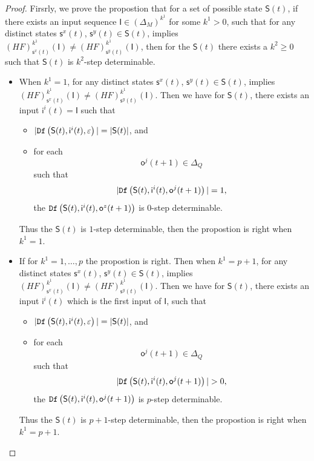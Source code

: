 \begin{proof}
Firsrly, we prove the propostion that for a set of possible state $\mathsf{S}(t)$, if there exists an input sequence $\mathsf{I}\in(\Delta_M)^{k^1}$ for some $k^1 >0$, such that for any distinct states $\mathsf{s}^{x}(t)$, $\mathsf{s}^{y}(t) \in \mathsf{S}(t)$, implies $(HF)^{k^1}_{\mathsf{s}^{x}(t)}(\mathsf{I})\neq (HF)^{k^1}_{\mathsf{s}^{y}(t)}(\mathsf{I})$, then for the $\mathsf{S}(t)$ there exists a $k^{2}\ge 0$ such that $\mathsf{S}(t)$ is $k^{2}$-step determinable.


\begin{itemize}
\item When $k^1=1$, for any distinct states $\mathsf{s}^{x}(t)$, $\mathsf{s}^{y}(t) \in \mathsf{S}(t)$, implies $(HF)^{k^1}_{\mathsf{s}^{x}(t)}(\mathsf{I})\neq (HF)^{k^1}_{\mathsf{s}^{y}(t)}(\mathsf{I})$. Then we have for $\mathsf{S}(t)$,
 there exists an input $\mathsf{i}^{i}(t)=\mathsf{I}$ such that
 \begin{itemize}
 \item  $|{\tt Df}\left(\mathsf{S}(t),\mathsf{i}^{i}(t),\varepsilon\right)|=|\mathsf{S}(t)|$, and 
 \item  for each \[\mathsf{o}^{j}(t+1)\in \Delta_Q\] such that \[|{\tt Df}\left(\mathsf{S}(t),\mathsf{i}^{i}(t),\mathsf{o}^{j}(t+1)\right)|=1,\] the ${\tt Df}\left(\mathsf{S}(t),\mathsf{i}^{i}(t),\mathsf{o}^{z}(t+1)\right)$ is $0$-step determinable.
 \end{itemize}
Thus the $\mathsf{S}(t)$ is $1$-step determinable, then the propostion is right when $k^1 =1$.

\item If for $k^1=1,\ldots, p$ the propostion is right. Then when $k^1=p+1$, for any distinct states $\mathsf{s}^{x}(t)$, $\mathsf{s}^{y}(t) \in \mathsf{S}(t)$, implies $(HF)^{k^1}_{\mathsf{s}^{x}(t)}(\mathsf{I})\neq (HF)^{k^1}_{\mathsf{s}^{y}(t)}(\mathsf{I})$. Then we have for $\mathsf{S}(t)$,
 there exists an input $\mathsf{i}^{i}(t)$ which is the first input of $\mathsf{I}$, such that
 \begin{itemize}
\item  $|{\tt Df}\left(\mathsf{S}(t),\mathsf{i}^{i}(t),\varepsilon\right)|=|\mathsf{S}(t)|$, and 
 \item  for each \[\mathsf{o}^{j}(t+1)\in \Delta_Q\] such that \[|\Ded\left(\mathsf{S}(t),\mathsf{i}^{i}(t),\mathsf{o}^{j}(t+1)\right)|>0,\]  the ${\tt Df}\left(\mathsf{S}(t),\mathsf{i}^{i}(t),\mathsf{o}^{j}(t+1)\right)$ is $p$-step determinable.
 \end{itemize}
Thus the $\mathsf{S}(t)$ is $p+1$-step determinable, then the propostion is right when $k^1 =p+1$.


\end{itemize}
\end{proof}
